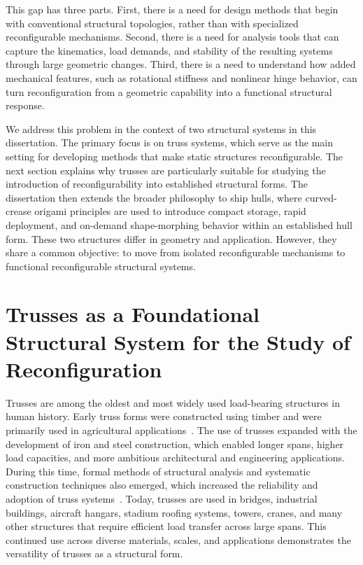 This gap has three parts. First, there is a need for design methods that begin with conventional structural topologies, rather than with specialized reconfigurable mechanisms. Second, there is a need for analysis tools that can capture the kinematics, load demands, and stability of the resulting systems through large geometric changes. Third, there is a need to understand how added mechanical features, such as rotational stiffness and nonlinear hinge behavior, can turn reconfiguration from a geometric capability into a functional structural response.

We address this problem in the context of two structural systems in this dissertation. The primary focus is on truss systems, which serve as the main setting for developing methods that make static structures reconfigurable. The next section explains why trusses are particularly suitable for studying the introduction of reconfigurability into established structural forms. The dissertation then extends the broader philosophy to ship hulls, where curved-crease origami principles are used to introduce compact storage, rapid deployment, and on-demand shape-morphing behavior within an established hull form. These two structures differ in geometry and application. However, they share a common objective: to move from isolated reconfigurable mechanisms to functional reconfigurable structural systems.

\section{Trusses as a Foundational Structural System for the Study of Reconfiguration}\label{01-sec-trusses}
Trusses are among the oldest and most widely used load-bearing structures in human history. Early truss forms were constructed using timber and were primarily used in agricultural applications~\cite{farshad1978iranian}. The use of trusses expanded with the development of iron and steel construction, which enabled longer spans, higher load capacities, and more ambitious architectural and engineering applications. During this time, formal methods of structural analysis and systematic construction techniques also emerged, which increased the reliability and adoption of truss systems~\cite{gasparini1989early, thorne2017structural}. Today, trusses are used in bridges, industrial buildings, aircraft hangars, stadium roofing systems, towers, cranes, and many other structures that require efficient load transfer across large spans. This continued use across diverse materials, scales, and applications demonstrates the versatility of trusses as a structural form.

